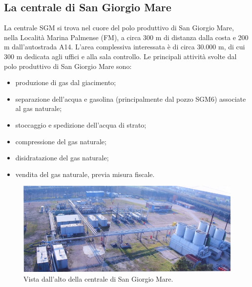 \subsection{La centrale di San Giorgio Mare}
La centrale SGM si trova nel cuore del polo produttivo di San Giorgio Mare, nella Località Marina Palmense (FM), a circa 300 m di distanza dalla costa e 200 m dall'autostrada A14. L'area complessiva interessata è di circa 30.000 m, di cui 300 m dedicata agli uffici e alla sala controllo.
Le principali attività svolte dal polo produttivo di San Giorgio Mare sono:
\begin{itemize}
 	\item produzione di gas dal giacimento;
 	\item separazione dell'acqua e gasolina (principalmente dal pozzo SGM6) associate al gas naturale;
 	\item stoccaggio e spedizione dell'acqua di strato;
 	\item compressione del gas naturale;
 	\item disidratazione del gas naturale;
 	\item vendita del gas naturale, previa misura fiscale.
\end{itemize}

\begin{figure}
    \centering
    \includegraphics[width=\textwidth]{fig/test/centrale/sgm-alto}
    \caption{Vista dall'alto della centrale di San Giorgio Mare.}
    \label{fig:sgm-alto}
\end{figure}

